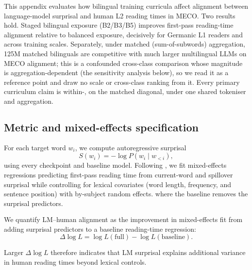 This appendix evaluates how bilingual training curricula affect alignment between language-model surprisal and human L2 reading times in MECO. Two results hold. Staged bilingual exposure (B2/B3/B5) improves first-pass reading-time alignment relative to balanced exposure, decisively for Germanic L1 readers and across training scales. Separately, under matched (sum-of-subwords) aggregation, 125M matched bilinguals are competitive with much larger multilingual LLMs on MECO alignment; this is a confounded cross-class comparison whose magnitude is aggregation-dependent (the sensitivity analysis below), so we read it as a reference point and draw no scale or cross-class ranking from it. Every primary curriculum claim is within-\beetle{}, on the matched diagonal, under one shared tokeniser and aggregation.
 
\subsection{Metric and mixed-effects specification}\label{sec:meco-metric-app}

 For each target word $w_i$, we compute autoregressive surprisal
 \[
 S(w_i) = -\log P(w_i \mid w_{<i}),
 \]
 using every \beetle{} checkpoint and baseline model. Following \citet{wilcox-etal-2023-language}, we fit mixed-effects regressions predicting first-pass reading time from current-word and spillover surprisal while controlling for lexical covariates (word length, frequency, and sentence position) with by-subject random effects. %
 where the baseline removes the surprisal predictors. 


We quantify LM--human alignment as the improvement in mixed-effects fit from adding surprisal predictors to a baseline reading-time regression:
\[
\Delta\log L = \log L(\text{full}) - \log L(\text{baseline}).
\]

Larger $\Delta\log L$ therefore indicates that LM surprisal explains additional variance in human reading times beyond lexical controls. 


